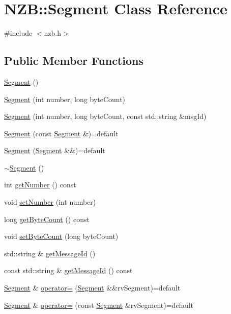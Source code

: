 \hypertarget{class_n_z_b_1_1_segment}{}\section{N\+ZB\+:\+:Segment Class Reference}
\label{class_n_z_b_1_1_segment}


{\ttfamily \#include $<$nzb.\+h$>$}

\subsection*{Public Member Functions}
\begin{DoxyCompactItemize}
\item 
\hyperlink{class_n_z_b_1_1_segment_a03b10b10c16c1906ec1c77f063dbf1b7}{Segment} ()
\item 
\hyperlink{class_n_z_b_1_1_segment_af4eb50bef48807f205ddc5cf1a0f9b20}{Segment} (int number, long byte\+Count)
\item 
\hyperlink{class_n_z_b_1_1_segment_a226cb3162ca909d5aa8b0a7d1abc3f40}{Segment} (int number, long byte\+Count, const std\+::string \&msg\+Id)
\item 
\hyperlink{class_n_z_b_1_1_segment_ab892c1d1a6a00b5267de13dc2a08aac8}{Segment} (const \hyperlink{class_n_z_b_1_1_segment}{Segment} \&)=default
\item 
\hyperlink{class_n_z_b_1_1_segment_a5c32e73629aa5a70e1a0bdaa819607e4}{Segment} (\hyperlink{class_n_z_b_1_1_segment}{Segment} \&\&)=default
\item 
\hyperlink{class_n_z_b_1_1_segment_a998df54e19e246e18669e5a876028383}{$\sim$\+Segment} ()
\item 
int \hyperlink{class_n_z_b_1_1_segment_a84476105a8639992e383a784fa7bbaf7}{get\+Number} () const
\item 
void \hyperlink{class_n_z_b_1_1_segment_aabe9d205530740251c739ba756a56174}{set\+Number} (int number)
\item 
long \hyperlink{class_n_z_b_1_1_segment_adeefb2996c75fec8f30191455520910f}{get\+Byte\+Count} () const
\item 
void \hyperlink{class_n_z_b_1_1_segment_a00d5dd3d50ec687f8e66e241c1431f9b}{set\+Byte\+Count} (long byte\+Count)
\item 
std\+::string \& \hyperlink{class_n_z_b_1_1_segment_a669b3f6b39250f3cf04f0a1cf3ad2a0d}{get\+Message\+Id} ()
\item 
const std\+::string \& \hyperlink{class_n_z_b_1_1_segment_a32fa4a2626200ab8760bf3c535174b63}{get\+Message\+Id} () const
\item 
\hyperlink{class_n_z_b_1_1_segment}{Segment} \& \hyperlink{class_n_z_b_1_1_segment_a233a84cbcb935bbdcbcc517f36ddd5cc}{operator=} (\hyperlink{class_n_z_b_1_1_segment}{Segment} \&\&rv\+Segment)=default
\item 
\hyperlink{class_n_z_b_1_1_segment}{Segment} \& \hyperlink{class_n_z_b_1_1_segment_a1ea88973387e81c1e83f6b05a1030e1a}{operator=} (const \hyperlink{class_n_z_b_1_1_segment}{Segment} \&rv\+Segment)=default
\end{DoxyCompactItemize}
